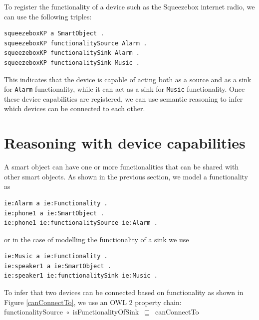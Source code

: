 To register the functionality of a device such as the Squeezebox internet radio, we can use the following triples:

\begin{verbatim}
squeezeboxKP a SmartObject .
squeezeboxKP functionalitySource Alarm .
squeezeboxKP functionalitySink Alarm .
squeezeboxKP functionalitySink Music .	
\end{verbatim}

This indicates that the device is capable of acting both as a source and as a sink for \texttt{Alarm} functionality, while it can act as a sink for \texttt{Music} functionality. Once these device capabilities are registered, we can use semantic reasoning to infer which devices can be connected to each other.



\section{Reasoning with device capabilities}
\label{ReasoningCapabilities}
A smart object can have one or more functionalities that can be shared with other smart objects. As shown in the previous section, we model a functionality as 

\begin{verbatim}               
ie:Alarm a ie:Functionality .
ie:phone1 a ie:SmartObject .
ie:phone1 ie:functionalitySource ie:Alarm . 
\end{verbatim}

or in the case of modelling the functionality of a sink we use

\begin{verbatim}               
ie:Music a ie:Functionality .
ie:speaker1 a ie:SmartObject .
ie:speaker1 ie:functionalitySink ie:Music . 
\end{verbatim}

To infer that two devices can be connected based on functionality as shown in Figure \ref{canConnectTo}, we use an \ac{OWL} 2 property chain:\\

\noindent
functionalitySource~\ensuremath{\circ}~isFunctionalityOfSink~\ensuremath{\sqsubseteq}~canConnectTo\\%

